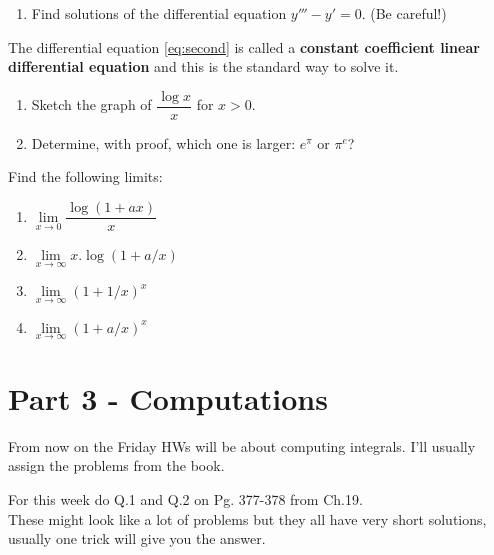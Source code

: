 \documentclass[9pt, a4paper, oneside, reqno]{amsart}
\begin{document}
\begin{questions}[resume]
\begin{enumerate}
		\item Find  solutions of the differential equation $ y''' - y' = 0$. (Be careful!)
	\end{enumerate}
	The differential equation \eqref{eq:second} is called a \textbf{constant coefficient linear differential equation} and this is the standard way to solve it.
	\item
	\begin{enumerate}
		\item Sketch the graph of $ \dfrac{\log x}{x}$ for $ x > 0$.
		\item Determine, with proof, which one is larger: $ e^ \pi$ or $ \pi^e$?
	\end{enumerate}
	\item  Find the following limits:
	\begin{multicols}{2}
		\begin{enumerate}
			\item $\lim \limits_{x \rightarrow 0}\dfrac{\log(1+ax)}{x}$
			\item $\lim \limits_{x \rightarrow \infty}x.{\log(1+a/x)} $
			\item $\lim \limits_{x \rightarrow \infty}(1+1/x)^x$
			\item $\lim \limits_{x \rightarrow \infty}(1+a/x)^x$
		\end{enumerate}
	\end{multicols}
\end{questions}




\newpage
\section*{Part 3 - Computations}
From now on the Friday HWs will be about computing integrals. I'll usually assign the problems from the book.
\begin{questions}[resume]
	\item For this week do Q.1 and Q.2 on Pg. 377-378 from Ch.19. \\
	These might look like a lot of problems but they all have very short solutions, usually one trick will give you the answer.
\end{questions}
\end{document}
